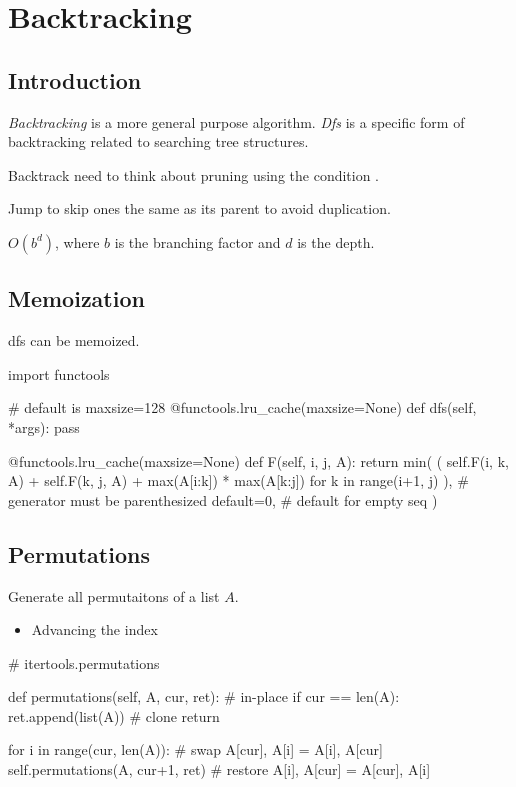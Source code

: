 \chapter{Backtracking}
\section{Introduction}
 \textit{Backtracking} is a more general purpose algorithm. \textit{Dfs} is a specific form of backtracking related to searching tree structures. 

 Backtrack need to think about pruning using the condition .

 Jump to skip ones the same as its parent to avoid duplication.

 $O(b^d)$, where $b$ is the branching factor and $d$ is the depth. 


\section{Memoization}
dfs can be memoized.
\begin{python}
import functools

# default is maxsize=128
@functools.lru_cache(maxsize=None)
def dfs(self, *args):
    pass


@functools.lru_cache(maxsize=None)
def F(self, i, j, A):
    return min(
        (
            self.F(i, k, A) + self.F(k, j, A)
            + max(A[i:k]) * max(A[k:j])
            for k in range(i+1, j)
        ),  # generator must be parenthesized 
        default=0,  # default for empty seq
    )
\end{python}
\section{Permutations}
 Generate all permutaitons of a list $A$.
\begin{itemize}
\item Advancing the index 
\end{itemize}

\begin{python}
# itertools.permutations 

def permutations(self, A, cur, ret):
    # in-place
    if cur == len(A):
        ret.append(list(A))  # clone
        return
    
    for i in range(cur, len(A)):
        # swap
        A[cur], A[i] = A[i], A[cur]
        self.permutations(A, cur+1, ret)
        # restore
        A[i], A[cur] = A[cur], A[i]
\end{python}

